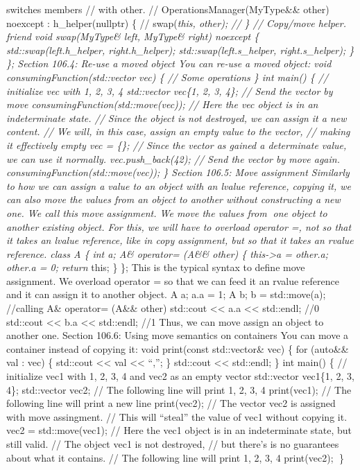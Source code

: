 switches members // with other. // OperationsManager(MyType\&\& other)
noexcept : h\_helper(nullptr) \{ // swap(\emph{this, other); // \} //
Copy/move helper. friend void swap(MyType\& left, MyType\& right)
noexcept \{ std::swap(left.h\_helper, right.h\_helper);
std::swap(left.s\_helper, right.s\_helper); \} \}; Section 106.4: Re-use
a moved object You can re-use a moved object: void
consumingFunction(std::vector vec) \{ // Some operations \} int main()
\{ // initialize vec with 1, 2, 3, 4 std::vector vec\{1, 2, 3, 4\}; //
Send the vector by move consumingFunction(std::move(vec)); // Here the
vec object is in an indeterminate state. // Since the object is not
destroyed, we can assign it a new content. // We will, in this case,
assign an empty value to the vector, // making it effectively empty vec
= \{\}; // Since the vector as gained a determinate value, we can use it
normally. vec.push\_back(42); // Send the vector by move again.
consumingFunction(std::move(vec)); \} Section 106.5: Move assignment
Similarly to how we can assign a value to an object with an lvalue
reference, copying it, we can also move the values from an object to
another without constructing a new one. We call this move assignment. We
move the values from one object to another existing object. For this,
we will have to overload operator =, not so that it takes an lvalue
reference, like in copy assignment, but so that it takes an rvalue
reference. class A \{ int a; A\& operator= (A\&\& other) \{
this-\textgreater a = other.a; other.a = 0; return }this; \} \}; This is
the typical syntax to deﬁne move assignment. We overload operator = so
that we can feed it an rvalue reference and it can assign it to another
object. A a; a.a = 1; A b; b = std::move(a); //calling A\& operator=
(A\&\& other) std::cout \textless\textless{} a.a \textless\textless{}
std::endl; //0 std::cout \textless\textless{} b.a \textless\textless{}
std::endl; //1 Thus, we can move assign an object to another one.
Section 106.6: Using move semantics on containers You can move a
container instead of copying it: void print(const std::vector\& vec) \{
for (auto\&\& val : vec) \{ std::cout \textless\textless{} val
\textless\textless{} ``,''; \} std::cout \textless\textless{} std::endl;
\} int main() \{ // initialize vec1 with 1, 2, 3, 4 and vec2 as an empty
vector std::vector vec1\{1, 2, 3, 4\}; std::vector vec2; // The
following line will print 1, 2, 3, 4 print(vec1); // The following line
will print a new line print(vec2); // The vector vec2 is assigned with
move assingment. // This will ``steal'' the value of vec1 without
copying it. vec2 = std::move(vec1); // Here the vec1 object is in an
indeterminate state, but still valid. // The object vec1 is not
destroyed, // but there's is no guarantees about what it contains. //
The following line will print 1, 2, 3, 4 print(vec2); \}
